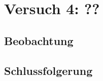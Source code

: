 \documentclass[11pt,a4paper,titlepage, ngerman]{article}
\begin{document}
	\section{Versuch 4: ??} %
	
		
		
		\subsection*{Beobachtung}
		
			
			
		\subsection*{Schlussfolgerung}	
		
			
		
	\begin{thebibliography}{1}
			
		
	\end{thebibliography}	
			
\end{document}
